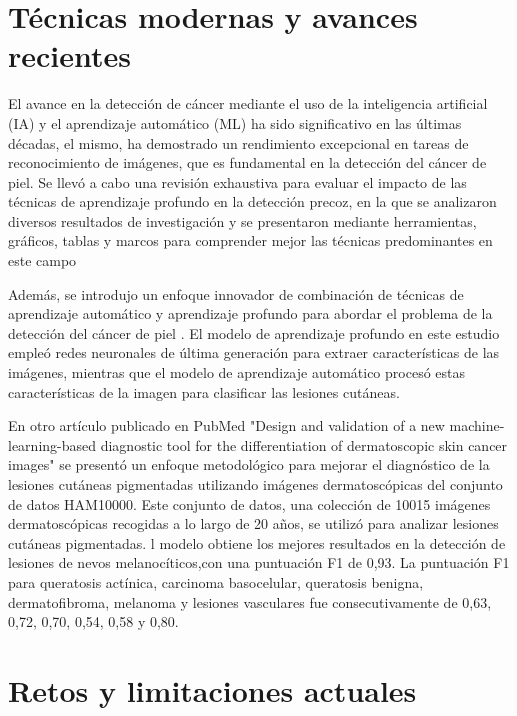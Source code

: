 \section*{Técnicas modernas y avances recientes}

El avance en la detección de cáncer mediante el uso de la inteligencia artificial (IA) y el aprendizaje automático (ML) ha sido significativo en 
las últimas décadas, el mismo, ha demostrado un rendimiento excepcional en tareas de reconocimiento de imágenes, que es fundamental en la detección 
del cáncer de piel. Se llevó a cabo una revisión exhaustiva para evaluar el impacto de las técnicas de aprendizaje profundo en la detección precoz, 
en la que se analizaron diversos resultados de investigación y se presentaron mediante herramientas, gráficos, tablas y marcos para comprender mejor 
las técnicas predominantes en este campo 


Además, se introdujo un enfoque innovador de combinación de técnicas de aprendizaje automático y aprendizaje profundo para abordar el 
problema de la detección del cáncer de piel .
 El modelo de aprendizaje profundo en este estudio empleó redes neuronales de última generación para extraer características de las imágenes, mientras que el modelo de aprendizaje automático procesó estas características de la imagen para clasificar las lesiones cutáneas.


En otro artículo publicado en PubMed "Design and validation of a new machine-learning-based diagnostic tool for the differentiation of dermatoscopic skin cancer images" 
 se presentó un enfoque metodológico para mejorar el diagnóstico de la lesiones cutáneas pigmentadas utilizando imágenes dermatoscópicas del conjunto de datos HAM10000. Este conjunto de datos, una colección de 10015 imágenes dermatoscópicas recogidas a lo largo de 20 años, se utilizó para analizar lesiones cutáneas pigmentadas. l modelo obtiene los mejores resultados en la detección de lesiones de nevos melanocíticos,con una puntuación F1 de 0,93. La puntuación F1 para queratosis actínica, carcinoma basocelular, queratosis benigna, dermatofibroma, melanoma y lesiones vasculares fue consecutivamente de 0,63, 0,72, 0,70, 0,54, 0,58 y 0,80.


\section*{Retos y limitaciones actuales}

